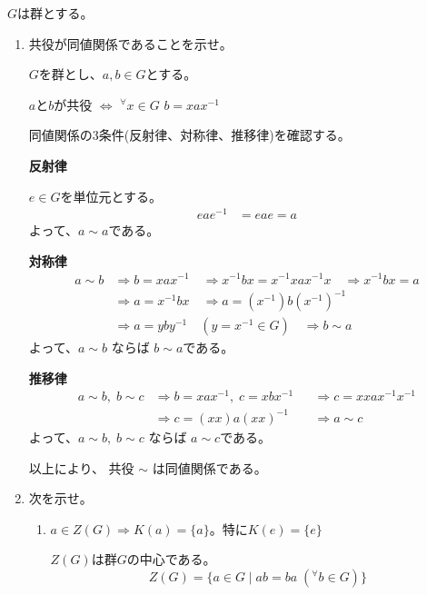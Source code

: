 \documentclass[12pt,b5paper]{ltjsarticle}
\begin{document}
\hrulefill

$G$は群とする。
\begin{enumerate}
 \item 共役が同値関係であることを示せ。

       \dotfill

       $G$を群とし、$a,b\in G$とする。

       $a$と$b$が共役
       $\Leftrightarrow$
       ${}^{\forall}x\in G$
       $b=xax^{-1}$

       同値関係の3条件(反射律、対称律、推移律)を確認する。

       \textbf{反射律}

       $e\in G$を単位元とする。
       \begin{align}
        eae^{-1}
        & = eae
        = a
       \end{align}
       よって、$a\sim a$である。

       \textbf{対称律}
       \begin{align}
        a\sim b
        & \Rightarrow b=xax^{-1} \quad
         \Rightarrow x^{-1}bx = x^{-1}xax^{-1}x \quad
         \Rightarrow x^{-1}bx = a \\
        & \Rightarrow a = x^{-1}bx \quad
         \Rightarrow a = (x^{-1})b(x^{-1})^{-1} \\
        & \Rightarrow a = y b y^{-1} \quad (y=x^{-1}\in G) \quad
         \Rightarrow b\sim a
       \end{align}
       よって、$a\sim b$ ならば $b\sim a$である。

       \textbf{推移律}
       \begin{align}
        a\sim b, \; b\sim c
        & \Rightarrow b=xax^{-1}, \; c=xbx^{-1} &
        & \Rightarrow c = xxax^{-1}x^{-1} \\
        & \Rightarrow c = (xx)a(xx)^{-1} &
        & \Rightarrow a \sim c
       \end{align}
       よって、$a\sim b,\; b\sim c$ ならば $a\sim c$である。

       以上により、
       共役 $\sim$ は同値関係である。

       \hrulefill

 \item 次を示せ。
      \begin{enumerate}
       \item $a\in Z(G) \Rightarrow K(a)=\{a\}$。特に$K(e)=\{e\}$

             \dotfill

             $Z(G)$は群$G$の中心である。
             \begin{equation}
              Z(G) = \{ a\in G \mid ab = ba \; ({}^{\forall}b\in G) \}
             \end{equation}


\end{enumerate}
\end{enumerate}
\end{document}
